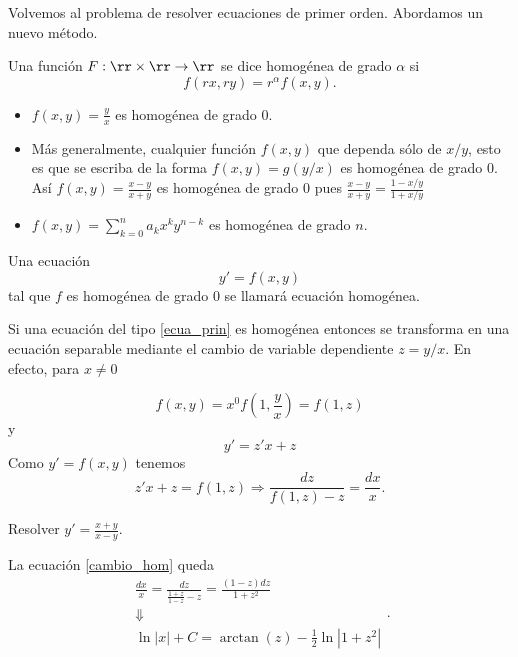 Volvemos al problema de resolver ecuaciones de primer orden. Abordamos un nuevo método.

\begin{definicion}{}
 Una función $F:\rr\times\rr\to\rr$ se dice homogénea de grado $\alpha$ si
 \[f(rx,ry)=r^{\alpha}f(x,y).\]
\end{definicion}

\begin{ejemplo}{}

\begin{itemize}
                 \item $f(x,y)=\tfrac{y}{x}$ es homogénea de grado $0$.
                 \item Más generalmente, cualquier función $f(x,y)$ que dependa sólo de $x/y$, esto es que se escriba de la forma $f(x,y)=g(y/x)$
                 es homogénea de grado  $0$. Así $f(x,y)=\tfrac{x-y}{x+y}$ es homogénea de grado $0$ pues $\tfrac{x-y}{x+y}= \tfrac{1-x/y}{1+x/y}$
                 \item $f(x,y)=\sum_{k=0}^na_kx^ky^{n-k}$ es homogénea de grado $n$.
\end{itemize}
\end{ejemplo}



\begin{definicion}{}
 Una ecuación
 \begin{equation}\label{ecua_prin}y'=f(x,y)\end{equation}
 tal que $f$ es homogénea de grado $0$ se llamará ecuación homogénea.
\end{definicion}

Si una ecuación del tipo \eqref{ecua_prin} es homogénea entonces se transforma en una ecuación separable mediante el cambio de variable dependiente $\boxed{z=y/x}$. En efecto, para $x\neq 0$

\[f(x,y)=x^0f\left(1,\frac{y}{x}\right)=f(1,z)\]
y
\[y'=z'x+z\]
Como $y'=f(x,y)$ tenemos
\begin{equation}\label{cambio_hom}z'x+z=f(1,z)\Longrightarrow \frac{dz}{f(1,z)-z}=\frac{dx}{x}.\end{equation}



\begin{ejemplo}{} Resolver $y'=\frac{x+y}{x-y}$.

La ecuación \eqref{cambio_hom} queda
\[ \begin{array}{c} \frac{dx}{x}=\frac{dz}{\frac{1+z}{1-z}-z}=\frac{(1-z)dz}{1+z^2}\\
 \Downarrow\\
\ln|x|+C=\arctan(z)-\frac{1}{2}\ln|1+z^2|
    \end{array}.
\]

\end{ejemplo}



